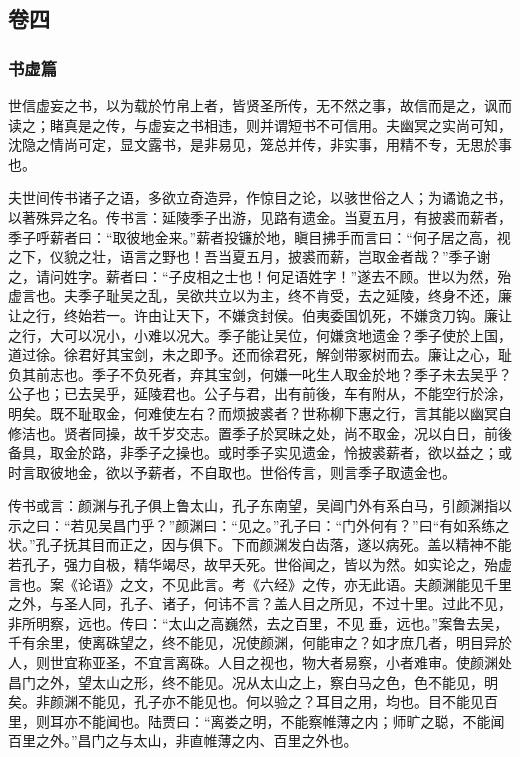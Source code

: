 \documentclass[]{article}
\begin{document}
\hypertarget{header-n149}{%
\subsection{卷四}\label{header-n149}}

\hypertarget{header-n150}{%
\subsubsection{书虚篇}\label{header-n150}}

世信虚妄之书，以为载於竹帛上者，皆贤圣所传，无不然之事，故信而是之，讽而读之；睹真是之传，与虚妄之书相违，则并谓短书不可信用。夫幽冥之实尚可知，沈隐之情尚可定，显文露书，是非易见，笼总并传，非实事，用精不专，无思於事也。

夫世间传书诸子之语，多欲立奇造异，作惊目之论，以骇世俗之人；为谲诡之书，以著殊异之名。传书言：延陵季子出游，见路有遗金。当夏五月，有披裘而薪者，季子呼薪者曰：``取彼地金来。''薪者投镰於地，瞋目拂手而言曰：``何子居之高，视之下，仪貌之壮，语言之野也！吾当夏五月，披裘而薪，岂取金者哉？''季子谢之，请问姓字。薪者曰：``子皮相之士也！何足语姓字！''遂去不顾。世以为然，殆虚言也。夫季子耻吴之乱，吴欲共立以为主，终不肯受，去之延陵，终身不还，廉让之行，终始若一。许由让天下，不嫌贪封侯。伯夷委国饥死，不嫌贪刀钩。廉让之行，大可以况小，小难以况大。季子能让吴位，何嫌贪地遗金？季子使於上国，道过徐。徐君好其宝剑，未之即予。还而徐君死，解剑带冢树而去。廉让之心，耻负其前志也。季子不负死者，弃其宝剑，何嫌一叱生人取金於地？季子未去吴乎？公子也；已去吴乎，延陵君也。公子与君，出有前後，车有附从，不能空行於涂，明矣。既不耻取金，何难使左右？而烦披裘者？世称柳下惠之行，言其能以幽冥自修洁也。贤者同操，故千岁交志。置季子於冥昧之处，尚不取金，况以白日，前後备具，取金於路，非季子之操也。或时季子实见遗金，怜披裘薪者，欲以益之；或时言取彼地金，欲以予薪者，不自取也。世俗传言，则言季子取遗金也。

传书或言：颜渊与孔子俱上鲁太山，孔子东南望，吴阊门外有系白马，引颜渊指以示之曰：``若见吴昌门乎？''颜渊曰：``见之。''孔子曰：``门外何有？''曰``有如系练之状。''孔子抚其目而正之，因与俱下。下而颜渊发白齿落，遂以病死。盖以精神不能若孔子，强力自极，精华竭尽，故早夭死。世俗闻之，皆以为然。如实论之，殆虚言也。案《论语》之文，不见此言。考《六经》之传，亦无此语。夫颜渊能见千里之外，与圣人同，孔子、诸子，何讳不言？盖人目之所见，不过十里。过此不见，非所明察，远也。传曰：``太山之高巍然，去之百里，不见垂，远也。''案鲁去吴，千有余里，使离硃望之，终不能见，况使颜渊，何能审之？如才庶几者，明目异於人，则世宜称亚圣，不宜言离硃。人目之视也，物大者易察，小者难审。使颜渊处昌门之外，望太山之形，终不能见。况从太山之上，察白马之色，色不能见，明矣。非颜渊不能见，孔子亦不能见也。何以验之？耳目之用，均也。目不能见百里，则耳亦不能闻也。陆贾曰：``离娄之明，不能察帷薄之内；师旷之聪，不能闻百里之外。''昌门之与太山，非直帷薄之内、百里之外也。
\end{document}
